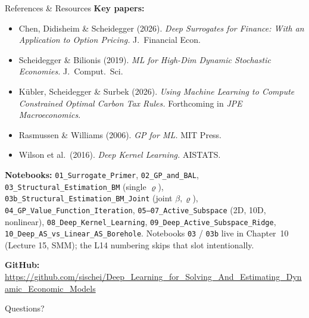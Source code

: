 \documentclass[aspectratio=169,11pt]{beamer}
\newcommand{\emphc}[1]{\textcolor{harvardcrimson}{#1}}
\begin{document}
\begin{frame}[shrink=5]{References \& Resources}
\footnotesize
\textbf{Key papers:}
\begin{itemize}\itemsep0pt \parskip0pt
  \item Chen, Didisheim \& Scheidegger (2026). \emph{Deep Surrogates for Finance: With an Application to Option Pricing.} J.\ Financial Econ.
  \item Scheidegger \& Bilionis (2019). \emph{ML for High-Dim Dynamic Stochastic Economies.} J.\ Comput.\ Sci.
  \item K\"ubler, Scheidegger \& Surbek (2026). \emph{Using Machine Learning to Compute Constrained Optimal Carbon Tax Rules.} Forthcoming in \emph{JPE Macroeconomics}.
  \item Rasmussen \& Williams (2006). \emph{GP for ML.} MIT Press.
  \item Wilson et al.\ (2016). \emph{Deep Kernel Learning.} AISTATS.
\end{itemize}

\vspace{0.1cm}
{\tiny \textbf{Notebooks:} \texttt{01\_Surrogate\_Primer}, \texttt{02\_GP\_and\_BAL}, \texttt{03\_Structural\_Estimation\_BM} (single $\varrho$), \texttt{03b\_Structural\_Estimation\_BM\_Joint} (joint $\beta,\varrho$), \texttt{04\_GP\_Value\_Function\_Iteration}, \texttt{05--07\_Active\_Subspace} (2D, 10D, nonlinear), \texttt{08\_Deep\_Kernel\_Learning}, \texttt{09\_Deep\_Active\_Subspace\_Ridge}, \texttt{10\_Deep\_AS\_vs\_Linear\_AS\_Borehole}.  Notebooks \texttt{03} / \texttt{03b} live in Chapter~10 (Lecture 15, SMM); the L14 numbering skips that slot intentionally.}

\vspace{0.15cm}
\textbf{GitHub:} \url{https://github.com/sischei/Deep_Learning_for_Solving_And_Estimating_Dynamic_Economic_Models}

\vspace{0.2cm}
\begin{center}
{\LARGE \emphc{Questions?}}
\end{center}
\end{frame}
\end{document}
